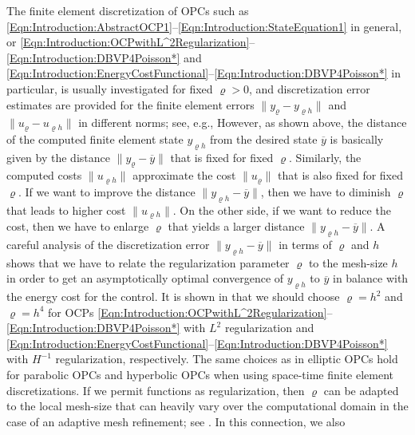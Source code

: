 \documentclass{article}
\numberwithin{equation}{section}
\begin{document}
The finite element discretization of OPCs such as
\eqref{Eqn:Introduction:AbstractOCP1}--\eqref{Eqn:Introduction:StateEquation1}
in general, or 
\eqref{Eqn:Introduction:OCPwithL^2Regularization}--\eqref{Eqn:Introduction:DBVP4Poisson*}
and \eqref{Eqn:Introduction:EnergyCostFunctional}--\eqref{Eqn:Introduction:DBVP4Poisson*} in particular,
is usually investigated for fixed $\varrho > 0$, and discretization error
estimates are provided for the finite element errors
$\| y_\varrho - y_{\varrho h}\|$ and $\|u_\varrho - u_{\varrho h}\|$ in
different norms; see, e.g.,
\cite{  LangerSteinbachTroeltzschYang:2021SINUM,
  LangerSteinbachTroeltzschYang:2021SISC,
  MeyerRoesch2004SICON,
  Roesch2004ZAA,
  RoeschSimon2007NFAO}
However, as shown above, the distance of the computed finite element state
$y_{\varrho h}$ from the desired state $\overline{y}$ is basically given by the 
distance $\|y_\varrho - \overline{y}\|$ that is fixed for fixed $\varrho$.
Similarly, the computed costs $\|u_{\varrho h}\|$ approximate the 
cost $\|u_\varrho\|$ that is also fixed for fixed $\varrho$. If we want to
improve the distance $\|y_{\varrho h} - \overline{y}\|$, then we have to
diminish $\varrho$ that leads to higher cost $\|u_{\varrho h}\|$. On the other
side, if we want to reduce the cost, then we have to enlarge $\varrho$ that
yields a larger distance $\|y_{\varrho h} - \overline{y}\|$. A careful
analysis of the discretization error $\|y_{\varrho h} - \overline{y}\|$ 
in terms of $\varrho$ and $h$ shows that we have to relate the
regularization parameter $\varrho$ to the mesh-size $h$ in order to get an
asymptotically optimal convergence of $y_{\varrho h}$ to $\overline{y}$ in
balance with the energy cost for the control. It is shown in   
\cite{LangerLoescherSteinbachYang:2023CMAM,LangerLoescherSteinbachYang:2024NLA}
that we should choose $\varrho = h^2$ and $\varrho = h^4$
for OCPs
\eqref{Eqn:Introduction:OCPwithL^2Regularization}--\eqref{Eqn:Introduction:DBVP4Poisson*}
with $L^2$ regularization and 
\eqref{Eqn:Introduction:EnergyCostFunctional}--\eqref{Eqn:Introduction:DBVP4Poisson*} 
with $H^{-1}$ regularization, respectively.
The same choices as in elliptic OPCs hold for parabolic OPCs
\cite{LangerSteinbachYang:2024ACOM} and hyperbolic OPCs
\cite{LoescherSteinbach:2022SINUM,LangerLoescherSteinbachYang:2025CAMWA} 
when using space-time finite element discretizations. If we permit functions
as regularization, then $\varrho$ can be adapted to the 
local mesh-size that can heavily vary over the computational domain 
in the case of an adaptive mesh refinement; see
\cite{LangerLoescherSteinbachYang:2024CAMWA}. In this connection, we also
\end{document}
